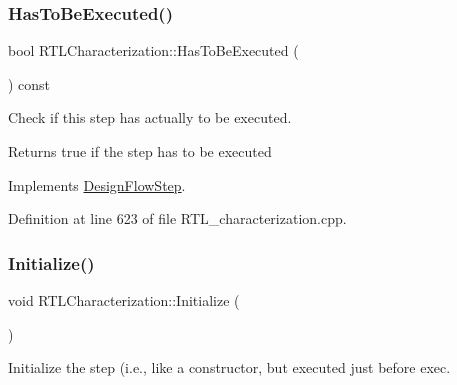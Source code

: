 \mbox{\label{classRTLCharacterization_a8bd96bf987458c331aab335f764da995}} 
\subsubsection{\texorpdfstring{Has\+To\+Be\+Executed()}{HasToBeExecuted()}}
{\footnotesize\ttfamily bool R\+T\+L\+Characterization\+::\+Has\+To\+Be\+Executed (\begin{DoxyParamCaption}{ }\end{DoxyParamCaption}) const\hspace{0.3cm}{\ttfamily [virtual]}}



Check if this step has actually to be executed. 

\begin{DoxyReturn}{Returns}
true if the step has to be executed 
\end{DoxyReturn}


Implements \hyperlink{classDesignFlowStep_a1783abe0c1d162a52da1e413d5d1ef05}{Design\+Flow\+Step}.



Definition at line 623 of file R\+T\+L\+\_\+characterization.\+cpp.

\mbox{\label{classRTLCharacterization_a5763e2ae1d1252dedf0b282a55526fd3}} 
\subsubsection{\texorpdfstring{Initialize()}{Initialize()}}
{\footnotesize\ttfamily void R\+T\+L\+Characterization\+::\+Initialize (\begin{DoxyParamCaption}{ }\end{DoxyParamCaption})\hspace{0.3cm}{\ttfamily [virtual]}}



Initialize the step (i.\+e., like a constructor, but executed just before exec. 



